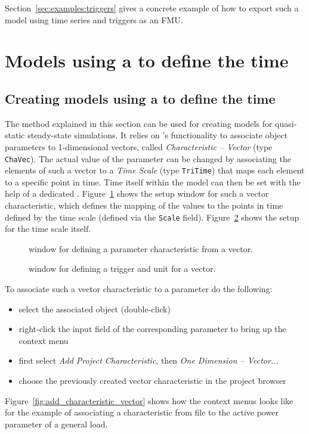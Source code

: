 Section~\ref{sec:examples:triggers} gives a concrete example of how to export such a model using time series and triggers as an FMU.

\newpage

\section{Models using a \dplscript to define the time}

\subsection{Creating models using a \dplscript to define the time}
\label{sec:export:create_model_dplscript}

The method explained in this section can be used for creating models for quasi-static steady-state simulations.
It relies on \pf's functionality to associate object parameters to 1-dimensional vectors, called \emph{Characteristic -- Vector} (type \texttt{ChaVec}).
The actual value of the parameter can be changed by associating the elements of such a vector to a \emph{Time Scale} (type \texttt{TriTime}) that maps each element to a specific point in time.
Time itself within the model can then be set with the help of a dedicated \dplscript.
Figure~\ref{fig:characteristics_from_vector} shows the setup window for such a vector characteristic, which defines the mapping of the values to the points in time defined by the time scale (defined via the \texttt{Scale} field).
Figure~\ref{fig:trigger_for_vector} shows the setup for the time scale itself.


\begin{figure}[h!]
\vspace*{1ex}
\caption{\pf window for defining a parameter characteristic from a vector.}
\label{fig:characteristics_from_vector}
\end{figure}

\begin{figure}[h!]
\vspace*{1ex}
\caption{\pf window for defining a trigger and unit for a vector.}
\label{fig:trigger_for_vector}
\end{figure}

To associate such a vector characteristic to a parameter do the following:
\begin{itemize}
  \item select the associated object (double-click)
  \item right-click the input field of the corresponding parameter to bring up the context menu
  \item first select \emph{Add Project Characteristic}, then \emph{One Dimension -- Vector...}
  \item choose the previously created vector characteristic in the project browser
\end{itemize} 
Figure~\ref{fig:add_characteristic_vector} shows how the context menus looks like for the example of associating a characteristic from file to the active power parameter of a general load.

